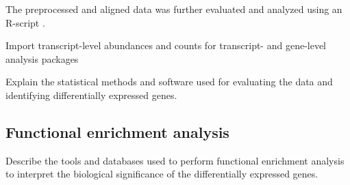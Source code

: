 The preprocessed and aligned data was further evaluated and analyzed using an R-script \autocite{R-base}.

Import transcript-level abundances and counts for transcript- and gene-level analysis packages

Explain the statistical methods and software used for evaluating the data and identifying differentially expressed genes.


\subsection{Functional enrichment analysis}
Describe the tools and databases used to perform functional enrichment analysis to interpret the biological significance of the differentially expressed genes.